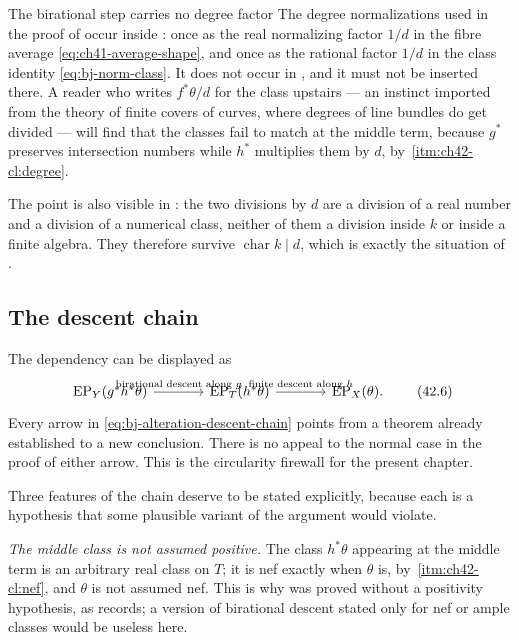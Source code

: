 \begin{warning}{The birational step carries no degree factor}
\label{warn:ch42-no-degree}
The degree normalizations used in the proof of
 occur inside
: once as the real normalizing factor
$1/d$ in the fibre average \eqref{eq:ch41-average-shape}, and once as the
rational factor $1/d$ in the class identity \eqref{eq:bj-norm-class}.  It
does not occur in , and it must not be
inserted there.  A reader who writes $f^*\theta/d$ for the class upstairs
--- an instinct imported from the theory of finite covers of curves, where
degrees of line bundles do get divided --- will find that the classes fail
to match at the middle term, because $g^*$ preserves intersection numbers
while $h^*$ multiplies them by $d$, by
\,\cref{itm:ch42-cl:degree}.

The point is also visible in : the two
divisions by $d$ are a division of a real number and a division of a
numerical class, neither of them a division inside $k$ or inside a finite
algebra.  They therefore survive $\operatorname{char}k\mid d$, which is
exactly the situation of .
\end{warning}

\subsection{The descent chain}
\label{sec:ch42-descent-chain}

The dependency can be displayed as
\[
\begin{tikzcd}[column sep=large]
 \operatorname{EP}_Y(g^*h^*\theta)
   \arrow[r,"\text{birational descent along }g"]
 &\operatorname{EP}_T(h^*\theta)
   \arrow[r,"\text{finite descent along }h"]
 &\operatorname{EP}_X(\theta).
\end{tikzcd}
\tag{42.6}\label{eq:bj-alteration-descent-chain}
\]
Every arrow in \eqref{eq:bj-alteration-descent-chain} points from a theorem
already established to a new conclusion.
There is no appeal to the normal case in the proof of either arrow.
This is the circularity firewall for the present chapter.

Three features of the chain deserve to be stated explicitly, because each
is a hypothesis that some plausible variant of the argument would violate.

\emph{The middle class is not assumed positive.}  The class $h^*\theta$
appearing at the middle term is an arbitrary real class on $T$; it is nef
exactly when $\theta$ is, by
\,\cref{itm:ch42-cl:nef}, and $\theta$ is not
assumed nef.  This is why  was proved without a
positivity hypothesis, as  records; a version of
birational descent stated only for nef or ample classes would be useless
here.

